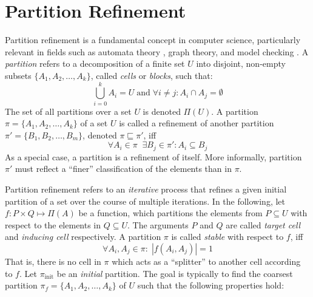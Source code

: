 		\clearpage
	
	\section{Partition Refinement}
	\label{chap:prelims:partitionref}
		Partition refinement is a fundamental concept in computer science, particularly relevant in fields such as automata theory \cite{hopcroftLogALGORITHMMINIMIZING1971a}, graph theory, and model checking \cite{baierPrinciplesModelChecking2008}.
		A \textit{partition} refers to a decomposition of a finite set $U$ into disjoint, non-empty subsets $\{ A_1, A_2, \ldots, A_k \}$, called \textit{cells} or \textit{blocks}, such that:
		\begin{equation*}
			\bigcup^k_{i=0} A_i = U \; \mathrm{and} \; \forall i \neq j: A_i \cap A_j = \emptyset
		\end{equation*}
		The set of all partitions over a set $U$ is denoted $\Pi(U)$. A partition $\pi = \{ A_1, A_2, \ldots, A_k \}$ of a set $U$ is called a refinement of another partition $\pi' = \{ B_1, B_2, \ldots, B_m \}$, denoted $\pi \sqsubseteq \pi'$, iff
		\begin{equation*}
			\forall A_i \in \pi \;\; \exists B_j \in \pi' : A_i \subseteq B_j
		\end{equation*} 
		As a special case, a partition is a refinement of itself.
		More informally, partition $\pi'$ must reflect a \enquote{finer} classification of the elements than in $\pi$. 
		
		Partition refinement refers to an \textit{iterative} process that refines a given initial partition of a set over the course of multiple iterations.
		In the following, let $f: P \times Q \mapsto \Pi(A)$ be a function, which partitions the elements from $P \subseteq U$ with respect to the elements in $Q \subseteq U$. The arguments $P$ and $Q$ are called \textit{target cell} and \textit{inducing cell} respectively.
		A partition $\pi$ is called \textit{stable} with respect to $f$, iff
		\begin{equation*}
			\forall A_i, A_j \in \pi: \; |f(A_i, A_j)| = 1
		\end{equation*}
		That is, there is no cell in $\pi$ which acts as a \enquote{splitter} to another cell according to $f$.
		Let $\pi_{\mathrm{init}}$ be an \textit{initial} partition. The goal is typically to find the coarsest partition $\pi_f = \{ A_1, A_2, \ldots, A_k \}$ of $U$ such that the following properties hold:
		
